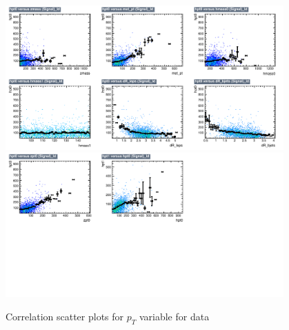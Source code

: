 \begin{figure}[!htb]%
\centering
\includegraphics[width=0.95\textwidth]{figures/CRTT/dataset/plots/correlationscatter_hpt0__Id_c1.pdf}
\includegraphics[width=0.95\textwidth]{figures/CRTT/dataset/plots/correlationscatter_hpt0__Id_c2.pdf}
\caption{ Correlation scatter plots for \HZZ $p_{T}$  variable for data}%
\label{fig:correlations_CRTT_hpt0_S}                                                       
\end{figure}



